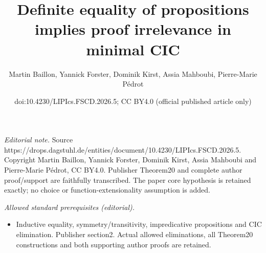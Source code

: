 \documentclass[10pt,a4paper]{amsart}
\title{Definite equality of propositions implies proof irrelevance in minimal CIC}
\author{Martin Baillon, Yannick Forster, Dominik Kirst, Assia Mahboubi, Pierre-Marie Pédrot}
\date{doi:10.4230/LIPIcs.FSCD.2026.5; CC BY4.0 (official published article only)}
\begin{document}
\maketitle
\noindent\textit{Editorial note.} Source https://drops.dagstuhl.de/entities/document/10.4230/LIPIcs.FSCD.2026.5. Copyright Martin Baillon, Yannick Forster, Dominik Kirst, Assia Mahboubi and Pierre-Marie Pédrot, CC BY4.0. Publisher Theorem20 and complete author proof/support are faithfully transcribed. The paper core hypothesis is retained exactly; no choice or function-extensionality assumption is added.\par\medskip
\noindent\textit{Allowed standard prerequisites (editorial).}\begin{itemize}
\item Inductive equality, symmetry/transitivity, impredicative propositions and CIC elimination. Publisher section2. Actual allowed eliminations, all Theorem20 constructions and both supporting author proofs are retained.
\end{itemize}\medskip
\end{document}

